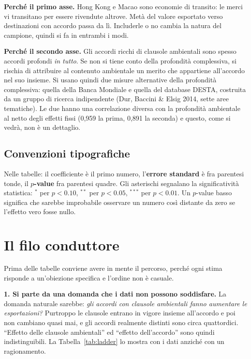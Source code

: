 \documentclass[11pt,a4paper]{article}
\begin{document}
\textbf{Perch\'e il primo asse.} Hong Kong e Macao sono economie di transito: le merci vi
transitano per essere rivendute altrove. Met\`a del valore esportato verso destinazioni
con accordo passa da l\`i. Includerle o no cambia la natura del campione, quindi si fa
in entrambi i modi.

\textbf{Perch\'e il secondo asse.} Gli accordi ricchi di clausole ambientali sono spesso
accordi profondi \emph{in tutto}. Se non si tiene conto della profondit\`a complessiva,
si rischia di attribuire al contenuto ambientale un merito che appartiene all'accordo nel
suo insieme. Si usano quindi due misure alternative della profondit\`a complessiva: quella
della Banca Mondiale e quella del database DESTA, costruita da un gruppo di ricerca
indipendente (Dur, Baccini \& Elsig 2014, sette aree tematiche). Le due hanno una correlazione
diversa con la profondit\`a ambientale al netto degli effetti fissi (0,959 la prima, 0,891 la
seconda) e questo, come si vedr\`a, non \`e un dettaglio.

\subsection*{Convenzioni tipografiche}

Nelle tabelle: il coefficiente \`e il primo numero, l'\textbf{errore standard} \`e fra
parentesi tonde, il \textbf{$p$-value} fra parentesi quadre. Gli asterischi segnalano la
significativit\`a statistica: $^{*}$ per $p<0.10$, $^{**}$ per $p<0.05$, $^{***}$ per
$p<0.01$. Un $p$-value basso significa che sarebbe improbabile osservare un numero cos\`i
distante da zero se l'effetto vero fosse nullo.

\newpage
\section{Il filo conduttore}

Prima delle tabelle conviene avere in mente il percorso, perch\'e ogni stima risponde a
un'obiezione specifica e l'ordine non \`e casuale.

\textbf{1. Si parte da una domanda che i dati non possono soddisfare.} La domanda naturale
sarebbe: \emph{gli accordi con clausole ambientali fanno aumentare le esportazioni?}
Purtroppo le clausole entrano in vigore insieme all'accordo e poi non cambiano quasi mai,
e gli accordi realmente distinti sono circa quattordici. ``Effetto delle clausole
ambientali'' ed ``effetto dell'accordo'' sono quindi indistinguibili. La
Tabella~\ref{tab:ladder} lo mostra con i dati anzich\'e con un ragionamento.
\end{document}
